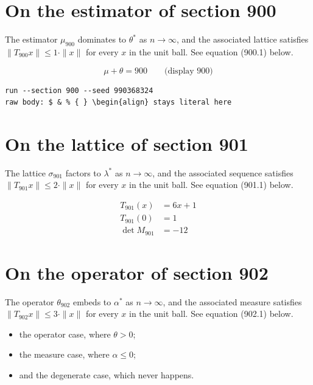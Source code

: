 \documentclass{article}
\begin{document}
\section{On the estimator of section 900}
The estimator $\mu_{900}$ dominates to $\theta^{*}$ as $n \to \infty$,
and the associated lattice satisfies $\|T_{900} x\| \leq 1 \cdot \|x\|$
for every $x$ in the unit ball. See equation (900.1) below.

$$
\mu + \theta = 900 \qquad \text{(display 900)}
$$

\begin{verbatim}
run --section 900 --seed 990368324
raw body: $ & % { } \begin{align} stays literal here
\end{verbatim}

\section{On the lattice of section 901}
The lattice $\sigma_{901}$ factors to $\lambda^{*}$ as $n \to \infty$,
and the associated sequence satisfies $\|T_{901} x\| \leq 2 \cdot \|x\|$
for every $x$ in the unit ball. See equation (901.1) below.

\begin{align}
T_{901}(x) &= 6 x + 1 \\
T_{901}(0) &= 1 \\
\det M_{901} &= -12
\end{align}

\section{On the operator of section 902}
The operator $\theta_{902}$ embeds to $\alpha^{*}$ as $n \to \infty$,
and the associated measure satisfies $\|T_{902} x\| \leq 3 \cdot \|x\|$
for every $x$ in the unit ball. See equation (902.1) below.

\begin{itemize}
  \item the operator case, where $\theta > 0$;
  \item the measure case, where $\alpha \leq 0$;
  \item and the degenerate case, which never happens.
\end{itemize}
\end{document}
